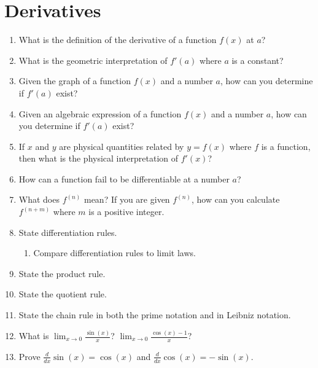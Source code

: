 \documentclass[../main.tex]{subfiles}
\begin{document}
\section{Derivatives}
\begin{enumerate}[label=\thesection.\arabic*, align=left]
  \item What is the definition of the derivative of a function \(f(x)\) at \(a\)? 

  \item What is the geometric interpretation of \(f'(a)\) where \(a\) is a constant?

  \item Given the graph of a function \(f(x)\) and a number \(a\), how can you determine if \(f'(a)\) exist?

  \item Given an algebraic expression of a function \(f(x)\) and a number \(a\), how can you determine if \(f'(a)\) exist?

  \item If \(x\) and \(y\) are physical quantities related by \(y = f(x)\) where \(f\) is a function, then what is the physical interpretation of \(f'(x)\)?

  \item How can a function fail to be differentiable at a number \(a\)?

  \item What does \(f^{(n)}\) mean? If you are given \(f^{(n)}\), how can you calculate \(f^{(n+m)}\) where \(m\) is a positive integer.

  \item State differentiation rules. 
    \begin{enumerate}
      \item Compare differentiation rules to limit laws. 
    \end{enumerate}

  \item State the product rule.

  \item State the quotient rule.

  \item State the chain rule in both the prime notation and in Leibniz notation. 

  \item What is \(\lim_{x \to 0} \frac{\sin(x)}{x}\)? \(\lim_{x \to 0} \frac{\cos(x) - 1}{x}\)?

  \item Prove \(\frac{d}{dx} \sin(x) = \cos(x)\) and \(\frac{d}{dx} \cos(x) = -\sin(x)\).


\end{enumerate}
\end{document}
